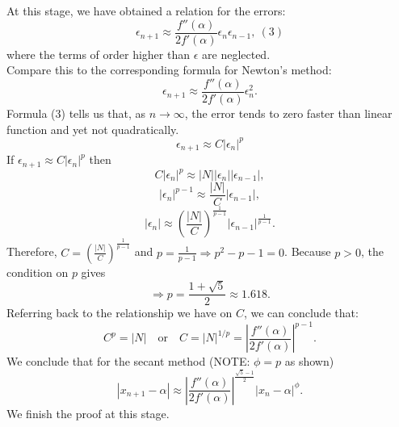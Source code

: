 \documentclass[12pt]{article}
\begin{document}
At this stage, we have obtained a relation for the errors:
\[
    \epsilon_{n+1} \approx \frac{f''(\alpha)}{2 f'(\alpha)} \epsilon_n \epsilon_{n-1}, \ (3)
\]
where the terms of order higher than \( \epsilon \) are neglected.
\\
Compare this to the corresponding formula for Newton's method:
\[
\epsilon_{n+1} \approx \frac{f''(\alpha)}{2 f'(\alpha)} \epsilon_n^2.
\]
Formula (3) tells us that, as \( n \to \infty \), the error tends to zero faster than linear function and yet not quadratically.
\[
    \epsilon_{n+1} \approx C |\epsilon_n|^p
\]
If \( \epsilon_{n+1} \approx C |\epsilon_n|^p \) then
\[
    C |\epsilon_n|^p \approx \left| N \right| |\epsilon_n| |\epsilon_{n-1}|,
\]
\[
    |\epsilon_n|^{p-1} \approx \frac{|N|}{C} |\epsilon_{n-1}|,
\]
\[
    |\epsilon_{n}| \approx \left( \frac{|N|}{C} \right)^{\frac{1}{p-1}} |\epsilon_{n-1}|^{\frac{1}{p-1}}.
\]
Therefore, \( C = \left( \frac{|N|}{C} \right)^{\frac{1}{p-1}} \) and \( p = \frac{1}{p-1} \Rightarrow p^2 - p - 1 = 0 \). Because \( p > 0 \), the condition on \( p \) gives
\[
    \Rightarrow p = \frac{1 + \sqrt{5}}{2} \approx 1.618.
\]
Referring back to the relationship we have on \( C \), we can conclude that:
\[
C^p = |N| \quad \text{or} \quad C = |N|^{1/p} = \left| \frac{f''(\alpha)}{2 f'(\alpha)} \right|^{p-1}.
\]
We conclude that for the secant method (NOTE: $\phi = p$ as shown)
\[
    |x_{n+1} - \alpha| \approx \left| \frac{f''(\alpha)}{2 f'(\alpha)} \right|^{\frac{\sqrt{5}-1}{2}} |x_n - \alpha|^{\phi}.
\]
We finish the proof at this stage.
\end{document}
